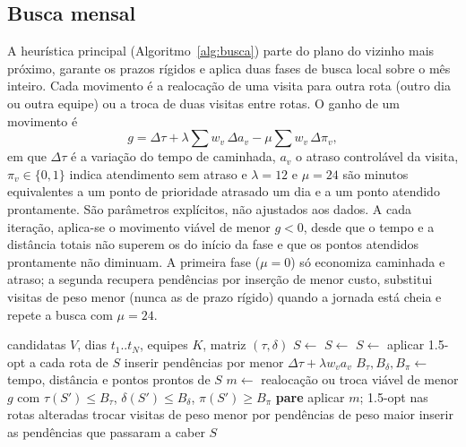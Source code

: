 \documentclass[conference,a4paper]{IEEEtran}
\begin{document}
\subsection{Busca mensal}

A heurística principal (Algoritmo~\ref{alg:busca}) parte do plano do vizinho mais próximo, garante os prazos rígidos e aplica duas fases de busca local sobre o mês inteiro. Cada movimento é a realocação de uma visita para outra rota (outro dia ou outra equipe) ou a troca de duas visitas entre rotas. O ganho de um movimento é
\begin{equation}
  g = \Delta\tau + \lambda \sum w_v\,\Delta a_v - \mu \sum w_v\,\Delta \pi_v,
\end{equation}
em que $\Delta\tau$ é a variação do tempo de caminhada, $a_v$ o atraso controlável da visita, $\pi_v \in\{0,1\}$ indica atendimento sem atraso e $\lambda = 12$ e $\mu = 24$ são minutos equivalentes a um ponto de prioridade atrasado um dia e a um ponto atendido prontamente. São parâmetros explícitos, não ajustados aos dados. A cada iteração, aplica-se o movimento viável de menor $g<0$, desde que o tempo e a distância totais não superem os do início da fase e que os pontos atendidos prontamente não diminuam. A primeira fase ($\mu=0$) só economiza caminhada e atraso; a segunda recupera pendências por inserção de menor custo, substitui visitas de peso menor (nunca as de prazo rígido) quando a jornada está cheia e repete a busca com $\mu=24$.

\begin{algorithm}[t]
\caption{Busca mensal}\label{alg:busca}
\footnotesize
\begin{algorithmic}[1]
\Require candidatas $V$, dias $t_1..t_N$, equipes $K$, matriz $(\tau,\delta)$
\State $S \gets$ 
\State $S \gets$ 
\State $S \gets$ 
\State \Return {}
  \State aplicar 1.5-opt a cada rota de $S$
   inserir pendências por menor $\Delta\tau + \lambda w_v a_v$ \EndIf
  \State $B_\tau, B_\delta, B_\pi \gets$ tempo, distância e pontos prontos de $S$
    \State $m \gets$ realocação ou troca viável de menor $g$
    \State \hspace{1em}com $\tau(S') \le B_\tau$, $\delta(S') \le B_\delta$, $\pi(S') \ge B_\pi$
     \textbf{pare} \EndIf
    \State aplicar $m$; 1.5-opt nas rotas alteradas
  \EndFor
    \State trocar visitas de peso menor por pendências de peso maior
    \State inserir as pendências que passaram a caber
  \EndIf
  \State \Return $S$
\EndFunction
\end{algorithmic}
\end{algorithm}
\end{document}
